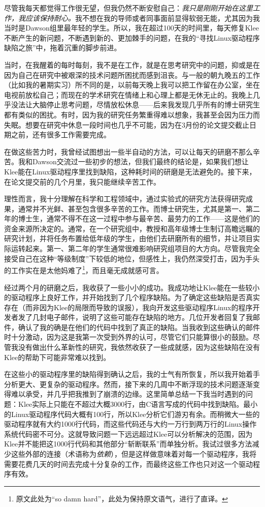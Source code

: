 \documentclass[letter,12pt]{book}
\begin{document}
\begin{CJK}{UTF8}{gbsn}
尽管我每天都觉得工作很无望，但我仍然不断安慰自己：\emph{我只是刚刚开始在这里工作，我应该保持耐心。}我不想在我的导师或者同事面前显得软弱无能，尤其因为我当时是Dawson组里最年轻的学生。所以，我在超过100天的时间里，每天修复Klee不断产生的新问题，不断遇到新的、更加棘手的问题，在我的“寻找Linux驱动程序缺陷之旅”中，拖着沉重的脚步前进。

当时，在我醒着的每时每刻，我不是在工作，就是在思考研究中的问题，抑或是在因为自己在研究中被艰深的技术问题所困扰而感到沮丧。与一般的朝九晚五的工作（比如我的暑期实习）所不同的是，以前每天晚上我可以把工作留在办公室，坐在电视前放松自己；而现在的学术研究在情绪上和心理上都是无休无止的。我晚上几乎没法让大脑停止思考问题，尽情放松休息——后来我发现几乎所有的博士研究生都有类似的困扰。有时，因为我的研究任务繁重得难以想象，我甚至会因为压力而失眠。想要在研究中休息一段时间也几乎不可能，因为在3月份的论文提交截止日期之前，还有很多工作需要完成。

在做这些苦力时，我曾经试图想出一些半自动的方法，可以让每天的研磨不那么辛苦。我和Dawson交流过一些初步的想法，但我们最终的结论是，如果我们想让Klee能在Linux驱动程序里找到缺陷，这种耗时间的研磨是无法避免的。接下来，在论文提交前的几个月里，我只能继续辛苦工作。

理性而言，我十分理解在科学和工程领域中，通过实验式的研究方法获得研究成果，通常并不光鲜、甚至包含很多辛苦的工作。而博士研究生，尤其是第一、第二年的博士生，通常不得不在这一过程中参与最辛苦、最劳力的工作——这是他们的资金来源所决定的。通常，在一个研究组中，教授和高年级博士生制订高瞻远瞩的研究计划，并将任务布置给低年级的学生，由他们去研磨所有的细节，并让项目实际运转起来。第一、第二年的学生通常很难影响研究组项目的大方向。尽管我完全接受自己在这种“等级制度”下较低的地位，但感性上，我仍然深受打击，因为手头的工作实在是太他妈难了\footnote{原文此处为“so damn hard”，此处为保持原文语气，进行了直译。}，而且毫无成就感可言。

\breakline

经过两个月的研磨之后，我收获了一些小小的成功。我成功地让Klee能在一些较小的驱动程序上良好工作，并开始找到了几个程序缺陷。为了确定这些缺陷是否真实存在（而非因为Klee的局限而导致的误报），我向开发这些驱动程序Linux的程序开发者发了几封电子邮件，说明了这些可能存在缺陷的地方。几位开发者回复了我邮件，确认了我的确是在他们的代码中找到了真正的缺陷。当我收到这些确认的邮件时十分激动，因为这是我第一次受到外界的认可，尽管它们只能算很小的鼓励。尽管我没有做出什么革新性的研究，我依然收获了一些成就感，因为这些缺陷在没有Klee的帮助下可能非常难以找到。

在这些小的驱动程序里的缺陷得到确认之后，我的士气有所恢复，所以我开始着手分析更大、更复杂的驱动程序。然而，接下来的几周中不断浮现的技术问题逐渐变得难以承受，并几乎把我推到了崩溃的边缘。这里简单总结一下我当时遇到的问题：Klee实际上只能在不超过大概3000行，由C语言写成的代码中找到缺陷。最小的Linux驱动程序代码大概有100行，所以Klee分析它们游刃有余。而稍微大一些的驱动程序就有大约1000行代码，而这些代码还与大约一万行到两万行的Linux操作系统代码密不可分。这就导致问题一下远远超过Klee可以分析解决的范围，因为Klee并不能把这1000行代码和其他部分“斩断联系”而单独分析。我试过很多方法减少这些外部的连接（术语称为\emph{依赖}），但是这样做意味着对每一个驱动程序，我将需要花费几天的时间去完成十分复杂的工作，而最终这些工作也只对这一个驱动程序有效。


\end{CJK}
\end{document}

